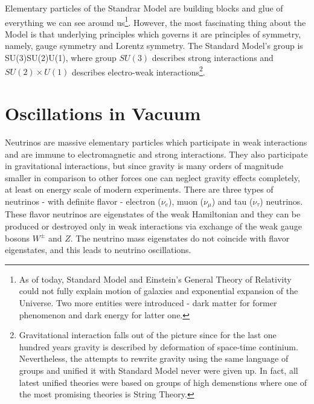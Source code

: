 Elementary particles of the Standrar Model are building blocks and glue of everything we
can see around us\footnote{As of today, Standard Model and Einstein's General Theory of 
Relativity could not fully explain motion of galaxies and exponential expansion of the Universe. 
Two more entities were introduced - dark matter for former phenomenon and dark energy 
for latter one.}. However, the most fascinating thing about the Model is that underlying 
principles which governs it are principles of symmetry, namely, gauge symmetry and Lorentz 
symmetry. The Standard Model's group is 
\be
SU(3)\times SU(2)\times U(1),
\ee 
where group $SU(3)$ describes strong interactions and $SU(2)\times U(1)$ describes 
electro-weak interactions\footnote{Gravitational interaction falls out of the picture
since for the last one hundred years gravity is described by deformation of space-time 
continium. Nevertheless, the attempts to rewrite gravity using the same language of groups
and unified it with Standard Model never were given up. In fact, all latest unified theories 
were based on groups of high demenstions where one of the most promising theories is 
String Theory.}. 

\section{Oscillations in Vacuum}
Neutrinos are massive elementary particles which participate in weak interactions 
and are immune to electromagnetic and strong interactions. They also participate 
in gravitational interactions, but since gravity is many orders of magnitude smaller 
in comparison to other forces one can neglect gravity effects completely, at least 
on energy scale of modern experiments. There are three types of neutrinos - 
with definite flavor - electron ($\nu_e$), muon ($\nu_\mu$) and tau ($\nu_\tau$) 
neutrinos. These flavor neutrinos are eigenstates of the weak Hamiltonian and they 
can be produced or destroyed only in weak interactions via exchange of the weak 
gauge bosons $W^\pm$ and $Z$. The neutrino mass eigenstates do not coincide with 
flavor eigenstates, and this leads to neutrino oscillations.

